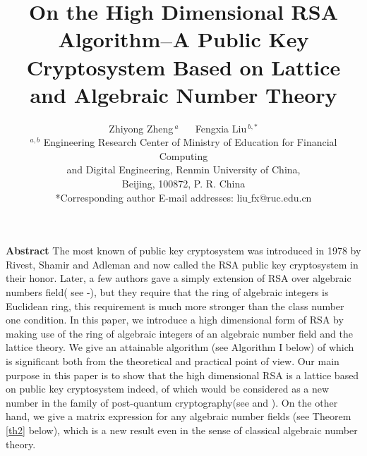 \documentclass [11pt]{article}
\begin{document}
\renewcommand{\theequation}{\arabic{section}.\arabic{equation}}
\def\t{mathbb{T}}
\def\r{\mathbb{R}}
\def\H{\mathcal{H}}
\def\x{\mathcal{X}}
\def\y{\mathcal{Y}}
\def\C{\mathbb{C}}
\def\n{\mathbb{N}}
\def\Z{\mathbb{Z}}
\def\<{\langle}
\def\>{\rangle}
\def\D{\boldsymbol{\mathcal{D}}}
\def\F{\mathcal{F}}
\def\2{L^2}
\def\c{L^2([0,T];H^1(0,1))}
\def\i{\infty}
\def\h{\hat}
\def\v{\vec}
\def\lam{\lambda}
\def\ds{\displaystyle}

\renewcommand{\abstractname}{}
\renewcommand{\theequation}{\thesection.\arabic{equation}}
\theoremstyle{definition}
\renewcommand{\proofname}{\noindent Proof}
\newtheorem{Definition}{\noindent Definition}[section]
\renewcommand{\refname}{\center{References}}


\title{\Large On the High Dimensional RSA Algorithm$\raisebox{0.5mm}{\bf{{---}}}$A Public Key Cryptosystem Based on Lattice and Algebraic Number Theory}


\author{Zhiyong Zheng$^{~a}$ ~~ Fengxia Liu$^{~b,*}$ \\[10pt]
\small {$^{a,b }$  Engineering Research Center of Ministry of Education for Financial Computing} \\
\small {and Digital Engineering, Renmin University of China,}\\
\small { Beijing, 100872, P. R. China}\\
{*Corresponding author E-mail addresses:  liu$\_$fx@ruc.edu.cn}}





\date{}
\maketitle


    \noindent \textbf{Abstract}   The most known of public key cryptosystem was introduced in 1978 by Rivest, Shamir and Adleman\cite{R}
    and now called the RSA public key  cryptosystem  in their honor. Later, a few authors gave a simply extension of RSA over algebraic numbers field( see \cite{T}-\cite{U2}), but they require that the ring of algebraic integers is Euclidean ring, this requirement is much more stronger than the class number one condition.  In this paper, we introduce a high dimensional form of RSA by making use
   of the ring of algebraic integers of an algebraic number field and the lattice theory. We give an  attainable algorithm (see Algorithm I below) of which is significant both from the theoretical and practical point of view. Our main purpose in this paper is to show that the high dimensional RSA is a lattice based on public key         cryptosystem  indeed, of which would be considered as a new number in the family
    of post-quantum cryptography(see \cite{P} and \cite{P2}). On the other hand, we give a matrix expression for any algebraic number fields (see Theorem \ref{th2} below), which is a new result even in  the sense of classical algebraic number theory.
\end{document}
